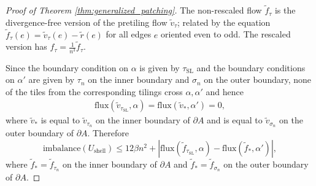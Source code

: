 \documentclass[10pt,a4paper]{amsart}
\begin{document}
\begin{proof}[Proof of Theorem \ref{thm:generalized_patching}]
    The non-rescaled flow $\widetilde f_\tau$ is the divergence-free version of the pretiling flow $\widetilde v_\tau$; related by the equation $\widetilde f_\tau(e) = \widetilde v_\tau(e) - \widetilde r(e)$ for all edges $e$ oriented even to odd. The rescaled version has $f_\tau = \frac{1}{n^3} \widetilde f_\tau$.
    
    Since the boundary condition on $\alpha$ is given by $\tau_{\text{SL}}$ and the boundary conditions on $\alpha'$ are given by $\tau_n$ on the inner boundary and $\sigma_n$ on the outer boundary, none of the tiles from the corresponding tilings cross $\alpha,\alpha'$ and hence
    \begin{align*}
        \text{flux}(\widetilde v_{\tau_{\text{SL}}},\alpha) = \text{flux}(\widetilde v_\ast,\alpha') = 0,
    \end{align*}
    where $\widetilde v_\ast$ is equal to $\widetilde v_{\tau_n}$ on the inner boundary of $\partial A$ and is equal to $\widetilde v_{\sigma_n}$ on the outer boundary of $\partial A$. Therefore
    \begin{equation}\label{eq:imbalanace_as_flux}
         \text{imbalance}(U_\text{shell})  \leq 12\beta n^2 + |\text{flux}(\widetilde f_{\tau_{\text{SL}}},\alpha) - \text{flux}(\widetilde f_{\ast},\alpha')|,
    \end{equation}
    where $\widetilde f_{\ast} = \widetilde f_{\tau_n}$ on the inner boundary of $\partial A$ and $\widetilde f_{\ast}=\widetilde f_{\sigma_n}$ on the outer boundary of $\partial A$.


\end{proof}
\end{document}
